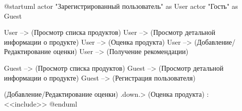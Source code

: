 @startuml
actor "Зарегистрированный пользователь" as User
actor "Гость" as Guest

User --> (Просмотр списка продуктов)
User --> (Просмотр детальной информации о продукте)
User --> (Оценка продукта)
User --> (Добавление/Редактирование оценки)
User --> (Получение рекомендации)

Guest --> (Просмотр списка продуктов)
Guest --> (Просмотр детальной информации о продукте)
Guest --> (Регистрация пользователя)

(Добавление/Редактирование оценки) .down.> (Оценка продукта) : <<include>>
@enduml